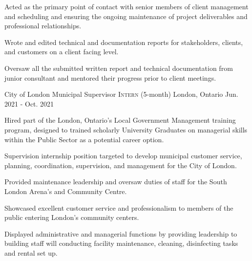 \begin{cventries}
{\begin{cvitems}
        \item Acted as the primary point of contact with senior members of client management and scheduling and ensuring the ongoing maintenance of project deliverables and professional relationships.
        \item Wrote and edited technical and documentation reports for stakeholders, clients, and customers on a client facing level.
        \item Oversaw all the submitted written report and technical documentation from junior consultant and mentored their progress prior to client meetings.
      \end{cvitems}
    }








  \cventry
    {City of London} %
    {Municipal Supervisor \textsc{Intern} (5-month) } %
    {London, Ontario } %
    {Jun. 2021 - Oct. 2021} %
    {
      \begin{cvitems} %
        \item Hired part of the London, Ontario's Local Government Management training program, designed to trained scholarly University Graduates on managerial skills within the Public Sector as a potential career option.
        \item Supervision internship position targeted to develop municipal customer service, planning, coordination, supervision, and management for the City of London.
        \item Provided maintenance leadership and oversaw duties of staff for the South London Arena’s and Community Centre.
        \item Showcased excellent customer service and professionalism to members of the public entering London’s community centers.
        \item Displayed administrative and managerial functions by providing leadership to building staff will conducting facility maintenance, cleaning, disinfecting tasks and rental set up.
      \end{cvitems}
    }







\end{cventries}
